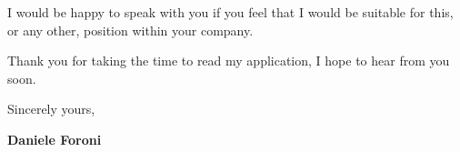 \documentclass[11pt,a4paper,colorlinks,linkcolor=true]{moderncv}
\begin{document}
\vspace*{3mm}

I would be happy to speak with you if you feel that I would be suitable for this, or any other, position within your company.

\vspace*{3mm}

Thank you for taking the time to read my application, I hope to hear from you soon.

\vspace*{3mm}

Sincerely yours,

\vspace*{10mm}

\textbf{Daniele Foroni}


\end{document}
